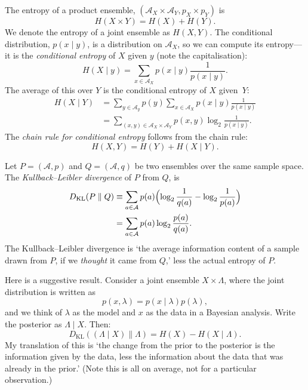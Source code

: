 \documentclass[10pt, a4paper, twocolumn]{article}
\begin{document}
The entropy of a product ensemble, $(\mathcal{A}_X\times\mathcal{A}_Y, p_X\times p_Y)$ is
\[
H(X\times Y) = H(X) + H(Y).
\]
We denote the entropy of a joint ensemble as $H(X, Y)$. The conditional
distribution, $p(x\mid y)$, is a distribution on $\mathcal{A}_X$, so we can compute
its entropy---it is the \emph{conditional entropy} of $X$ given $y$ (note the
capitalisation):
\[
H(X \mid y) = \sum_{x\in \mathcal{A}_X} p(x\mid y)\frac{1}{p(x\mid y)}.
\]
The average of this over $Y$ is the conditional entropy of $X$ given~$Y$:
\[
\begin{aligned}
  H(X \mid Y) &= \sum_{y\in \mathcal{A}_y} p(y) \sum_{x\in \mathcal{A}_X} p(x\mid y)\frac{1}{p(x\mid
    y)} \\
  &= \sum_{(x,y)\in\mathcal{A}_X\times\mathcal{A}_Y} p(x, y) \log_2\frac{1}{p(x\mid y)}.
\end{aligned}
\]
The \emph{chain rule for conditional entropy} follows from the chain rule:
\[
H(X, Y) = H(Y) + H(X \mid Y).
\]

Let $P=(\mathcal{A}, p)$ and $Q=(\mathcal{A}, q)$ be two ensembles over the same
sample space. The \emph{Kullback--Leibler divergence} of $P$ from $Q$, is
\[
\begin{aligned}
D_{\text{KL}}(P \parallel Q) &\equiv \sum_{a\in\mathcal{A}} p(a) \Bigl( \log_2\frac{1}{q(a)} -
\log_2\frac{1}{p(a)} \Bigr) \\
&= \sum_{a\in\mathcal{A}} p(a)\log_2\frac{p(a)}{q(a)}.
\end{aligned}
\]
The Kullback--Leibler divergence is `the average information content of a
sample drawn from $P$, if we \emph{thought} it came from $Q$,' less the actual
entropy of $P$.

Here is a suggestive result. Consider a joint ensemble $X\times\Lambda$, where the joint
distribution is written as
\[
p(x, \lambda) = p(x \mid \lambda) p(\lambda),
\]
and we think of $\lambda$ as the model and $x$ as the data in a Bayesian
analysis. Write the posterior as $\Lambda \mid X$. Then:
\[
D_{\text{KL}}((\Lambda \mid X) \parallel \Lambda) = H(X) - H(X \mid \Lambda).
\]
My translation of this is `the change from the prior to the posterior is the
information given by the data, less the information about the data that was
already in the prior.' (Note this is all on average, not for a particular
observation.)

\printbibliography
\end{document}
